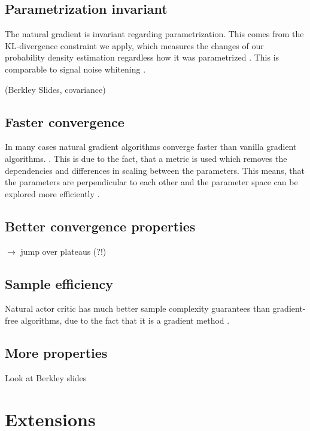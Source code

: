 \subsection{Parametrization invariant}
The natural gradient is invariant regarding parametrization. This comes from the KL-divergence constraint we apply, which measures the changes of our probability density estimation regardless how it was parametrized \cite{pascanu2013revisiting}. This is comparable to signal noise whitening \cite{sohl2012natural}.

(Berkley Slides, covariance)

\subsection{Faster convergence}
In many cases natural gradient algorithms converge faster than vanilla gradient algorithms. \cite{sohl2012natural, amari1998natural, ??}. This is due to the fact, that a metric is used which removes the dependencies and differences in scaling between the parameters. This means, that the parameters are perpendicular to each other and the parameter space can be explored more efficiently \cite{sohl2012natural}.

\subsection{Better convergence properties}
\cite{amari1998natural} $\rightarrow$ jump over plateaus (?!)

\subsection{Sample efficiency}

Natural actor critic has much better sample complexity guarantees than gradient-free algorithms, due to the fact that it is a gradient method \cite{nemirovski2005efficient}.

\subsection{More properties}

Look at Berkley slides

\newpage
\section{Extensions}

